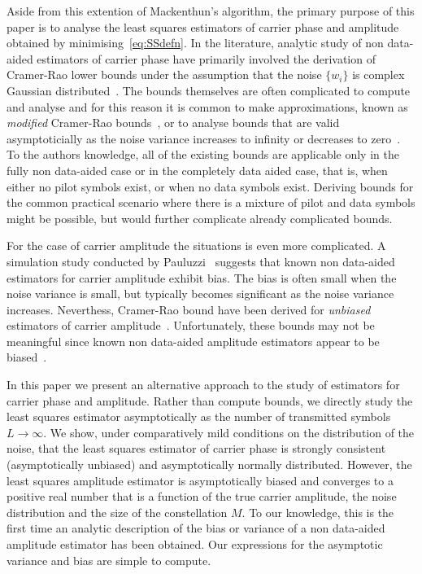 \documentclass[journal]{IEEEtran}
\begin{document}
Aside from this extention of Mackenthun's algorithm, the primary purpose of this paper is to analyse the least squares estimators of carrier phase and amplitude obtained by minimising~\eqref{eq:SSdefn}.  In the literature, analytic study of non data-aided estimators of carrier phase have primarily involved the derivation of Cramer-Rao lower bounds under the assumption that the noise $\{w_i\}$ is complex Gaussian distributed~\cite{Delmas_exact_crb_psk_2008,950345,Steendam_lowsnr_crb_2001,Cowley_crbs_phase_freq_1996,DAndrea_modified_bounds_1994}.  The bounds themselves are often complicated to compute and analyse and for this reason it is common to make approximations, known as \emph{modified} Cramer-Rao bounds~\cite{DAndrea_modified_bounds_1994,Pollok_mckilliam_crb_cpm_2013}, or to analyse bounds that are valid asymptoticially as the noise variance increases to infinity or decreases to zero~\cite{Moeneclaey_limit_crbs_1998,Steendam_lowsnr_crb_2001,Delmas_exact_crb_psk_2008}.  To the authors knowledge, all of the existing bounds are applicable only in the fully non data-aided case or in the completely data aided case, that is, when either no pilot symbols exist, or when no data symbols exist.  Deriving bounds for the common practical scenario where there is a mixture of pilot and data symbols might be possible, but would further complicate already complicated bounds.

For the case of carrier amplitude the situations is even more complicated.  A simulation study conducted by Pauluzzi~\cite{Pauluzzi2000} suggests that known non data-aided estimators for carrier amplitude exhibit bias.  The bias is often small when the noise variance is small, but typically becomes significant as the noise variance increases.  Neverthess, Cramer-Rao bound have been derived for \emph{unbiased} estimators of carrier amplitude~\cite{Alagha_crb_snr_bpsk_qpsk_2001,Delmas_exact_crb_psk_2008}.  Unfortunately, these bounds may not be meaningful since known non data-aided amplitude estimators appear to be biased~\cite{Pauluzzi2000}. 

In this paper we present an alternative approach to the study of estimators for carrier phase and amplitude.  Rather than compute bounds, we directly study the least squares estimator asymptotically as the number of transmitted symbols $L\to \infty$.  We show, under comparatively mild conditions on the distribution of the noise, that the least squares estimator of carrier phase is strongly consistent (asymptotically unbiased) and asymptotically normally distributed.  However, the least squares amplitude estimator is asymptotically biased and converges to a positive real number that is a function of the true carrier amplitude, the noise distribution and the size of the constellation $M$.  To our knowledge, this is the first time an analytic description of the bias or variance of a non data-aided amplitude estimator has been obtained.  Our expressions for the asymptotic variance and bias are simple to compute.  %
\end{document}
